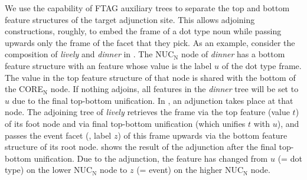 \documentclass[output=paper,colorlinks,citecolor=brown,chinesefont]{langscibook}
\begin{document}
We use the capability of FTAG auxiliary trees to separate the top and bottom feature structures of the target adjunction site. This allows adjoining constructions, roughly, to embed the frame of a dot type noun while passing upwards only the frame of the facet that they pick. 
%
As an example, consider the composition of \emph{lively} and \emph{dinner} in . The NUC$_\mathrm{N}$ node of \emph{dinner} has a bottom feature structure with an  feature whose value is the label $u$ of the dot type frame. The  value in the top feature structure of that node is shared with the bottom of the CORE$_\mathrm{N}$ node. If nothing adjoins, all  features in the \emph{dinner} tree will be set to $u$ due to the final top-bottom unification. In , an adjunction takes place at that node. The adjoining tree of \emph{lively} retrieves the  frame via the top  feature (value $t$) of its foot node and via final top-bottom unification (which unifies $t$ with $u$), and passes the event facet (, label $z$) of this frame upwards via the bottom feature structure of its root node.  shows the result of the adjunction  after the final top-bottom unification. Due to the adjunction, the  feature has changed from $u$ (= dot type) on the lower NUC$_\mathrm{N}$ node to $z$ (= event) on the higher NUC$_\mathrm{N}$ node.
\end{document}
